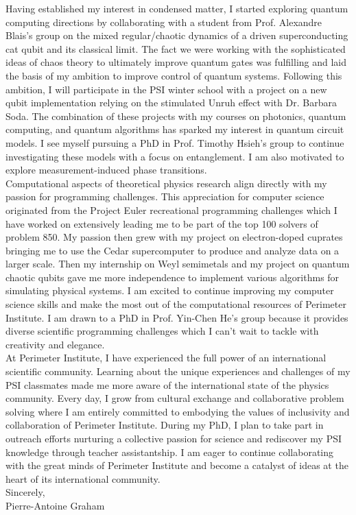 \documentclass[12pt]{article}
\begin{document}
Having established my interest in condensed matter, I started exploring quantum computing directions by collaborating with a student from Prof. Alexandre Blais's group on the mixed regular/chaotic dynamics of a driven superconducting cat qubit and its classical limit. The fact we were working with the sophisticated ideas of chaos theory to ultimately improve quantum gates was fulfilling and laid the basis of my ambition to improve control of quantum systems. Following this ambition, I will participate in the PSI winter school with a project on a new qubit implementation relying on the stimulated Unruh effect with Dr. Barbara Soda. The combination of these projects with my courses on photonics, quantum computing, and quantum algorithms has sparked my interest in quantum circuit models. I see myself pursuing a PhD in Prof. Timothy Hsieh's group to continue investigating these models with a focus on entanglement. I am also motivated to explore measurement-induced phase transitions.\\

Computational aspects of theoretical physics research align directly with my passion for programming challenges. This appreciation for computer science originated from the Project Euler recreational programming challenges which I have worked on extensively leading me to be part of the top 100 solvers of problem 850. My passion then grew with my project on electron-doped cuprates bringing me to use the Cedar supercomputer to produce and analyze data on a larger scale. Then my internship on Weyl semimetals and my project on quantum chaotic qubits gave me more independence to implement various algorithms for simulating physical systems. I am excited to continue improving my computer science skills and make the most out of the computational resources of Perimeter Institute. I am drawn to a PhD in Prof. Yin-Chen He's group because it provides diverse scientific programming challenges which I can't wait to tackle with creativity and elegance.\\

At Perimeter Institute, I have experienced the full power of an international scientific community. Learning about the unique experiences and challenges of my PSI classmates made me more aware of the international state of the physics community. Every day, I grow from cultural exchange and collaborative problem solving where I am entirely committed to embodying the values of inclusivity and collaboration of Perimeter Institute. During my PhD, I plan to take part in outreach efforts nurturing a collective passion for science and rediscover my PSI knowledge through teacher assistantship. I am eager to continue collaborating with the great minds of Perimeter Institute and become a catalyst of ideas at the heart of its international community.\\

Sincerely,\\
Pierre-Antoine Graham
\end{document}
